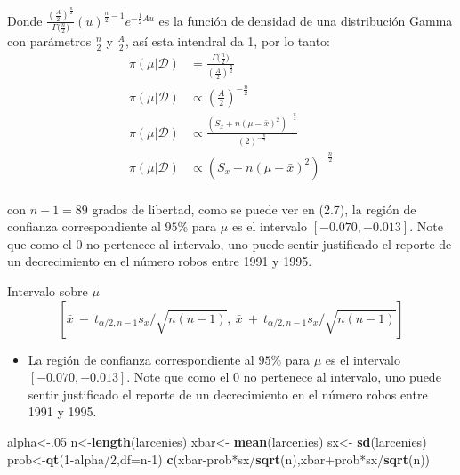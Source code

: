 \documentclass[12pt,]{article}
\newenvironment{Shaded}{\begin{snugshade}}{\end{snugshade}}
\newcommand{\KeywordTok}[1]{\textcolor[rgb]{0.13,0.29,0.53}{\textbf{{#1}}}}
\newcommand{\DataTypeTok}[1]{\textcolor[rgb]{0.13,0.29,0.53}{{#1}}}
\newcommand{\DecValTok}[1]{\textcolor[rgb]{0.00,0.00,0.81}{{#1}}}
\newcommand{\StringTok}[1]{\textcolor[rgb]{0.31,0.60,0.02}{{#1}}}
\newcommand{\NormalTok}[1]{{#1}}
\providecommand{\tightlist}{%
  \setlength{\itemsep}{0pt}\setlength{\parskip}{0pt}}
\begin{document}
Donde
\(\frac{(\frac{A}{2})^{\frac{n}{2}}}{\Gamma{(\frac{n}{2}})}(u)^{\frac{n}{2}-1}e^{-\frac{1}{2}Au}\)
es la función de densidad de una distribución Gamma con parámetros
\(\frac{n}{2}\) y \(\frac{A}{2}\), así esta intendral da 1, por lo
tanto: \[
\begin{array}{rl}
\pi(\mu|\mathcal{D}) & = \displaystyle \frac{\Gamma{(\frac{n}{2}})}{(\frac{A}{2})^{\frac{n}{2}}}\\
\pi(\mu|\mathcal{D}) & \propto \left( \frac{A}{2}\right)^{-\frac{n}{2}}\\
\pi(\mu|\mathcal{D}) & \propto  \frac{\left(S_x + n(\mu-\bar x)^2\right)^{-\frac{n}{2}}}{\left(2\right)^{-\frac{n}{2}}}\\
\pi(\mu|\mathcal{D}) & \propto  \left(S_x + n(\mu-\bar x)^2\right)^{-\frac{n}{2}}\\
\end{array}
\]

con \(n-1=89\) grados de libertad, como se puede ver en (2.7), la región
de confianza correspondiente al \(95\%\) para \(\mu\) es el intervalo
\([-0.070,-0.013]\). Note que como el \(0\) no pertenece al intervalo,
uno puede sentir justificado el reporte de un decrecimiento en el número
robos entre 1991 y 1995.

Intervalo sobre \(\mu\) \[
[\bar{x}\ -\ t_{\alpha/2,n-1}s_x/\sqrt{n(n-1)},\ \bar{x}\ +\ t_{\alpha/2,n-1}s_x/\sqrt{n(n-1)}]
\]

\begin{itemize}
\tightlist
\item
  La región de confianza correspondiente al \(95\%\) para \(\mu\) es el
  intervalo \([-0.070,-0.013]\). Note que como el \(0\) no pertenece al
  intervalo, uno puede sentir justificado el reporte de un decrecimiento
  en el número robos entre 1991 y 1995.
\end{itemize}

\begin{Shaded}
\begin{Highlighting}[]
\NormalTok{alpha<-.}\DecValTok{05}
\NormalTok{n<-}\KeywordTok{length}\NormalTok{(larcenies)}
\NormalTok{xbar<-}\StringTok{ }\KeywordTok{mean}\NormalTok{(larcenies)}
\NormalTok{sx<-}\StringTok{ }\KeywordTok{sd}\NormalTok{(larcenies)}
\NormalTok{prob<-}\KeywordTok{qt}\NormalTok{(}\DecValTok{1}\NormalTok{-alpha/}\DecValTok{2}\NormalTok{,}\DataTypeTok{df=}\NormalTok{n}\DecValTok{-1}\NormalTok{)}
\KeywordTok{c}\NormalTok{(xbar-prob*sx/}\KeywordTok{sqrt}\NormalTok{(n),xbar+prob*sx/}\KeywordTok{sqrt}\NormalTok{(n))}
\end{Highlighting}
\end{Shaded}
\end{document}
